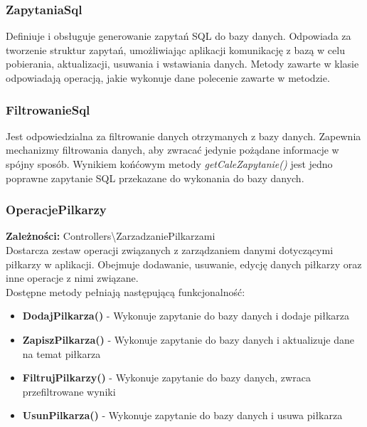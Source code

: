     \subsubsection{ZapytaniaSql}
    Definiuje i obsługuje generowanie zapytań SQL do bazy danych. Odpowiada za tworzenie struktur zapytań, umożliwiając aplikacji komunikację z bazą w celu pobierania, aktualizacji, usuwania i wstawiania danych.
    Metody zawarte w klasie odpowiadają operacją, jakie wykonuje dane polecenie zawarte w metodzie.
     


    \subsubsection{FiltrowanieSql}
    Jest odpowiedzialna za filtrowanie danych otrzymanych z bazy danych. Zapewnia mechanizmy filtrowania danych, aby  zwracać jedynie pożądane informacje w spójny sposób. Wynikiem końćowym metody \textit{getCaleZapytanie()} jest 
    jedno poprawne zapytanie SQL przekazane do wykonania do bazy danych. 
     

    \subsubsection{OperacjePilkarzy}

        \textbf{Zależności: } 
        Controllers\textbackslash{}ZarzadzaniePilkarzami\\

        Dostarcza zestaw operacji związanych z zarządzaniem danymi dotyczącymi piłkarzy w aplikacji. Obejmuje dodawanie, usuwanie, edycję danych piłkarzy oraz inne operacje z nimi związane.\\
      
        Dostępne metody pełniają następującą funkcjonalność: 
        \begin{itemize}
            \item \textbf{DodajPilkarza()} - Wykonuje zapytanie do bazy danych i dodaje piłkarza
            \item \textbf{ZapiszPilkarza()} - Wykonuje zapytanie do bazy danych i aktualizuje dane na temat piłkarza
            \item \textbf{FiltrujPilkarzy()} - Wykonuje zapytanie do bazy danych, zwraca przefiltrowane wyniki
            \item \textbf{UsunPilkarza()} - Wykonuje zapytanie do bazy danych i usuwa piłkarza
        \end{itemize}
         


